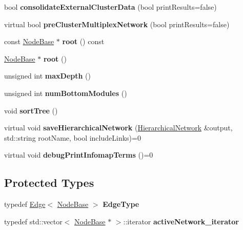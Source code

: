 \begin{DoxyCompactItemize}
bool {\bfseries consolidate\+External\+Cluster\+Data} (bool print\+Results=false)
\item 
\mbox{\label{classInfomapBase_a72e68d442f3becf6e55942c8a0c15ca8}} 
virtual bool {\bfseries pre\+Cluster\+Multiplex\+Network} (bool print\+Results=false)
\item 
\mbox{\label{classInfomapBase_a33a93dfdd5140b67eff80260f573968f}} 
const \mbox{\hyperlink{classNodeBase}{Node\+Base}} $\ast$ {\bfseries root} () const
\item 
\mbox{\label{classInfomapBase_a2927fa281448a7bf6aa489179186be95}} 
\mbox{\hyperlink{classNodeBase}{Node\+Base}} $\ast$ {\bfseries root} ()
\item 
\mbox{\label{classInfomapBase_a0d80d820eaaf0208a857445fbdfeeb49}} 
unsigned int {\bfseries max\+Depth} ()
\item 
\mbox{\label{classInfomapBase_a45e57381daf363449416709beb430ca8}} 
unsigned int {\bfseries num\+Bottom\+Modules} ()
\item 
\mbox{\label{classInfomapBase_a4193d5838c66fb72a6b3d3ae11a6c1d7}} 
void {\bfseries sort\+Tree} ()
\item 
\mbox{\label{classInfomapBase_afa239266be668176e188942ff419cf13}} 
virtual void {\bfseries save\+Hierarchical\+Network} (\mbox{\hyperlink{classHierarchicalNetwork}{Hierarchical\+Network}} \&output, std\+::string root\+Name, bool include\+Links)=0
\item 
\mbox{\label{classInfomapBase_a9f3e9969b570435ce7da33c282992ae6}} 
virtual void {\bfseries debug\+Print\+Infomap\+Terms} ()=0
\end{DoxyCompactItemize}
\subsection*{Protected Types}
\begin{DoxyCompactItemize}
\item 
\mbox{\label{classInfomapBase_aa518ba75554156fa59a7a33b4ada17d6}} 
typedef \mbox{\hyperlink{classEdge}{Edge}}$<$ \mbox{\hyperlink{classNodeBase}{Node\+Base}} $>$ {\bfseries Edge\+Type}
\item 
\mbox{\label{classInfomapBase_a5d6f282c78e746621d33ca8a99d4230f}} 
typedef std\+::vector$<$ \mbox{\hyperlink{classNodeBase}{Node\+Base}} $\ast$ $>$\+::iterator {\bfseries active\+Network\+\_\+iterator}
\end{DoxyCompactItemize}

